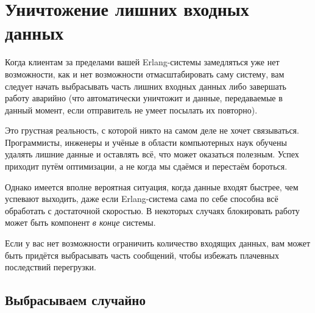 \documentclass[11pt, oneside]{book}   	%
\begin{document}
\section{Уничтожение лишних входных данных}

Когда клиентам за пределами вашей Erlang-системы замедляться уже нет возможности, как и нет возможности отмасштабировать саму систему, вам следует начать выбрасывать часть лишних входных данных либо завершать работу аварийно (что автоматически уничтожит и данные, передаваемые в данный момент, если отправитель не умеет посылать их повторно).

Это грустная реальность, с которой никто на самом деле не хочет связываться. Программисты, инженеры и учёные в области компьютерных наук обучены удалять лишние данные и оставлять всё, что может оказаться полезным. Успех приходит  путём оптимизации, а не когда мы сдаёмся и перестаём бороться.

Однако имеется вполне вероятная ситуация, когда данные входят быстрее, чем успевают выходить, даже если Erlang-система сама по себе способна всё обработать с достаточной скоростью. В некоторых случаях блокировать работу может быть компонент \emph{в конце} системы.

Если у вас нет возможности ограничить количество входящих данных, вам может быть придётся выбрасывать часть сообщений, чтобы избежать плачевных последствий перегрузки.


\subsection{Выбрасываем случайно}
\end{document}
